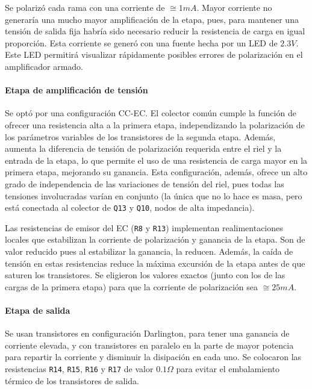 \documentclass[a4paper,12pt,twoside]{article}
\begin{document}
Se polarizó cada rama con una corriente de $\cong 1mA$. Mayor corriente no generaría una mucho mayor amplificación de la etapa, pues, para mantener una tensión de salida fija habría sido necesario reducir la resistencia de carga en igual proporción. Esta corriente se generó con una fuente hecha por un LED de $2.3V$. Este LED permitirá visualizar rápidamente posibles errores de polarización en el amplificador armado.


\paragraph{Etapa de amplificación de tensión}

Se optó por una configuración CC-EC. El colector común cumple la función de ofrecer una resistencia alta a la primera etapa, independizando la polarización de los parámetros variables de los transistores de la segunda etapa. Además, aumenta la diferencia de tensión de polarización requerida entre el riel y la entrada de la etapa, lo que permite el uso de una resistencia de carga mayor en la primera etapa, mejorando su ganancia. Esta configuración, además, ofrece un alto grado de independencia de las variaciones de tensión del riel, pues todas las tensiones involucradas varían en conjunto (la única que no lo hace es masa, pero está conectada al colector de \texttt{Q13} y \texttt{Q10}, nodos de alta impedancia). 

Las resistencias de emisor del EC (\texttt{R8} y \texttt{R13}) implementan realimentaciones locales que estabilizan la corriente de polarización y ganancia de la etapa. Son de valor reducido pues al estabilizar la ganancia, la reducen. Además, la caída de tensión en estas resistencias reduce la máxima excursión de la etapa antes de que saturen los transistores. Se eligieron los valores exactos (junto con los de las cargas de la primera etapa) para que la corriente de polarización sea $\cong 25mA$.

\paragraph{Etapa de salida}

Se usan transistores en configuración Darlington, para tener una ganancia de corriente elevada, y con transistores en paralelo en la parte de mayor potencia para repartir la corriente y disminuir la disipación en cada uno. Se colocaron las resistencias \texttt{R14}, \texttt{R15}, \texttt{R16} y \texttt{R17} de valor $0.1\Omega$ para evitar el embalamiento térmico de los transistores de salida.
\end{document}
